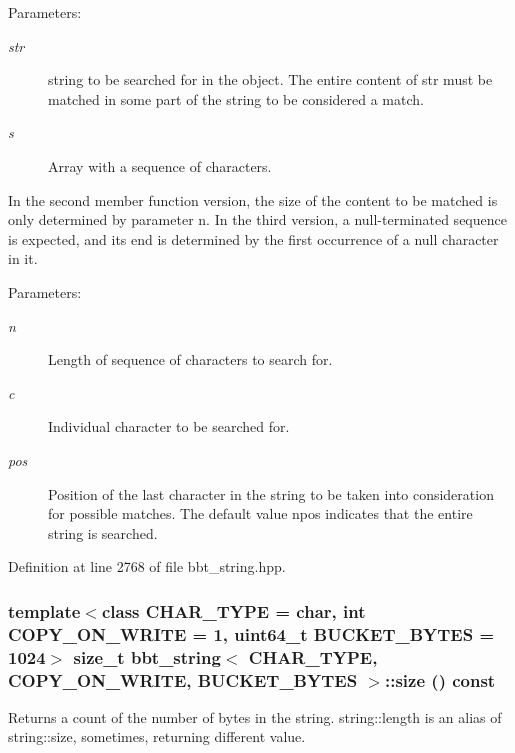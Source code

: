 \begin{Desc}
\item[Parameters:]
\begin{description}
\item[{\em str}]string to be searched for in the object. The entire content of str must be matched in some part of the string to be considered a match. \item[{\em s}]Array with a sequence of characters.\end{description}
\end{Desc}
In the second member function version, the size of the content to be matched is only determined by parameter n. In the third version, a null-terminated sequence is expected, and its end is determined by the first occurrence of a null character in it. \begin{Desc}
\item[Parameters:]
\begin{description}
\item[{\em n}]Length of sequence of characters to search for. \item[{\em c}]Individual character to be searched for. \item[{\em pos}]Position of the last character in the string to be taken into consideration for possible matches. The default value npos indicates that the entire string is searched. \end{description}
\end{Desc}


Definition at line 2768 of file bbt\_\-string.hpp.\hypertarget{classbbt__string_d702780b8d0a6de141d9a02ab0b7b0a0}{
\subsubsection[{size}]{\setlength{\rightskip}{0pt plus 5cm}template$<$class CHAR\_\-TYPE  = char, int COPY\_\-ON\_\-WRITE = 1, uint64\_\-t BUCKET\_\-BYTES = 1024$>$ size\_\-t {\bf bbt\_\-string}$<$ CHAR\_\-TYPE, COPY\_\-ON\_\-WRITE, BUCKET\_\-BYTES $>$::size () const}}
\label{classbbt__string_d702780b8d0a6de141d9a02ab0b7b0a0}


Returns a count of the number of bytes in the string. string::length is an alias of string::size, sometimes, returning different value. 

